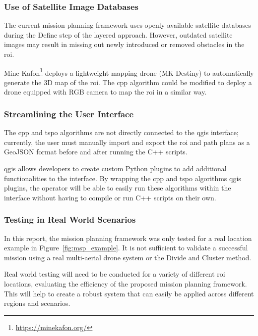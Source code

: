 \subsubsection{Use of Satellite Image Databases}

The current mission planning framework uses openly available satellite databases during the Define step of the layered approach. However, outdated satellite images may result in missing out newly introduced or removed obstacles in the \gls{roi}. 

Mine Kafon\footnote{\url{https://minekafon.org/}} deploys a lightweight mapping drone (MK Destiny) to automatically generate the 3D map of the \gls{roi}. The \gls{cpp} algorithm could be modified to deploy a drone equipped with RGB camera to map the \gls{roi} in a similar way.  

\subsubsection{Streamlining the User Interface}

The \gls{cpp} and \gls{tspo} algorithms are not directly connected to the \gls{qgis} interface; currently, the user must manually import and export the \gls{roi} and path plans as a GeoJSON format before and after running the C++ scripts. 

\gls{qgis} allows developers to create custom Python plugins to add additional functionalities to the interface. By wrapping the \gls{cpp} and \gls{tspo} algorithms \gls{qgis} plugins, the operator will be able to easily run these algorithms within the interface without having to compile or run C++ scripts on their own. 

\subsubsection{Testing in Real World Scenarios}

In this report, the mission planning framework was only tested for a real location example in Figure~\ref{fig:msp_example}. It is not sufficient to validate a successful mission using a real multi-aerial drone system or the Divide and Cluster method. 

Real world testing will need to be conducted for a variety of different \gls{roi} locations, evaluating the efficiency of the proposed mission planning framework. This will help to create a robust system that can easily be applied across different regions and scenarios. 
